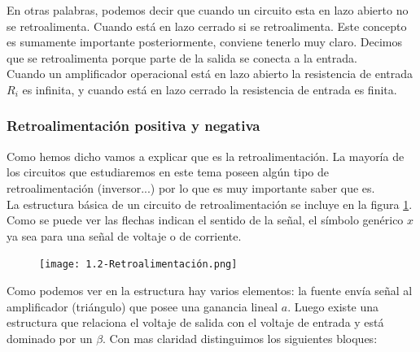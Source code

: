 \documentclass[12pt,a4paper]{article}
\numberwithin{equation}{section}
\numberwithin{figure}{section}
\begin{document}
En otras palabras, podemos decir que cuando un circuito esta en
 lazo abierto no se retroalimenta. Cuando está en lazo cerrado si se retroalimenta. Este concepto es sumamente importante posteriormente, conviene tenerlo muy claro. Decimos que se retroalimenta porque parte de la salida se conecta a la entrada. \\
  
 
Cuando un amplificador operacional está en lazo abierto la resistencia de entrada $R_i$ es infinita, y cuando está en lazo cerrado la resistencia de entrada es finita. 

\subsubsection{Retroalimentación positiva y negativa}


Como hemos dicho vamos a explicar que es la retroalimentación. La mayoría de los circuitos que estudiaremos en este tema poseen algún  tipo de retroalimentación (inversor...) por lo que es muy importante saber que es. \\

La estructura básica de un circuito de retroalimentación se incluye en la figura \ref{Fig:1.2.3-Retroalimentacion}. Como se puede ver las flechas indican el sentido de la señal, el símbolo genérico $x$ ya sea para una señal de voltaje o de corriente. 



\begin{figure}[h!] \centering
\texttt{[image: 1.2-Retroalimentación.png]}
\caption{}
\label{Fig:1.2.3-Retroalimentacion}
\end{figure}


Como podemos ver en la estructura hay varios elementos: la fuente envía señal al amplificador (triángulo) que posee una ganancia lineal $a$. Luego existe una estructura que relaciona el voltaje de salida con el voltaje de entrada y está dominado por un $\beta$. Con mas claridad distinguimos los siguientes bloques:
\end{document}
